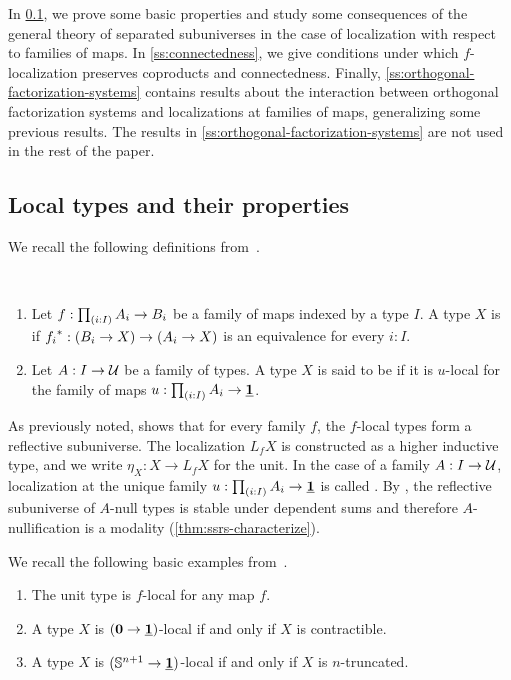 In \cref{ss:basic-properties}, we prove some basic properties and study some consequences
of the general theory of separated subuniverses in the case of localization with respect to families of maps.
In \cref{ss:connectedness}, we give conditions under which
$f$-localization preserves coproducts and connectedness.
Finally, \cref{ss:orthogonal-factorization-systems} contains results about the interaction between
orthogonal factorization systems and localizations at families of maps, generalizing some
previous results. The results in \cref{ss:orthogonal-factorization-systems} are not used in the rest
of the paper.

\subsection{Local types and their properties}\label{ss:basic-properties}

We recall the following definitions from~\cite{RijkeShulmanSpitters}.
\begin{defn}\ 
\begin{enumerate}
\item    Let $f: \prd{i:I} A_i \to B_i$ be a family of maps indexed by a type $I$.
    A type $X$ is \define{$f$-local} if
    ${f_i}^\ast : (B_i \to X) \to (A_i \to X)$ is an equivalence for every $i : I$.
\item Let $A:I\to\mathcal{U}$ be a family of types. A type $X$ is said to be \define{$A$-null} if it is $u$-local for the family of maps $u:\prd{i:I}A_i\to\unit$. 
\end{enumerate}
\end{defn} 

As previously noted, \cite[Theorem 2.16]{RijkeShulmanSpitters} shows that for every
family $f$, the $f$-local types form a reflective subuniverse.
The localization $L_f X$ is constructed as a higher inductive type,
and we write $\eta_X : X \to L_f X$ for the unit.
In the case of a family $A:I\to\mathcal{U}$, localization at the unique family $u:\prd{i:I}A_i \to \unit$ is called .
By \cite[Theorem 2.17]{RijkeShulmanSpitters}, the reflective subuniverse of $A$-null types is stable under dependent sums and therefore $A$-nullification is a modality (\cref{thm:ssrs-characterize}).

\begin{eg} We recall the following basic examples from~\cite{RijkeShulmanSpitters}.
\begin{enumerate}
\item The unit type is $f$-local for any map $f$.
\item A type $X$ is $(\mathbf{0}\to\underline{\mathbf{1}})$-local if and only if $X$ is contractible.
\item A type $X$ is $(\mathbb{S}^{n+1}\to\underline{\mathbf{1}})$-local if and only if $X$ is $n$-truncated.
\end{enumerate}
\end{eg}

